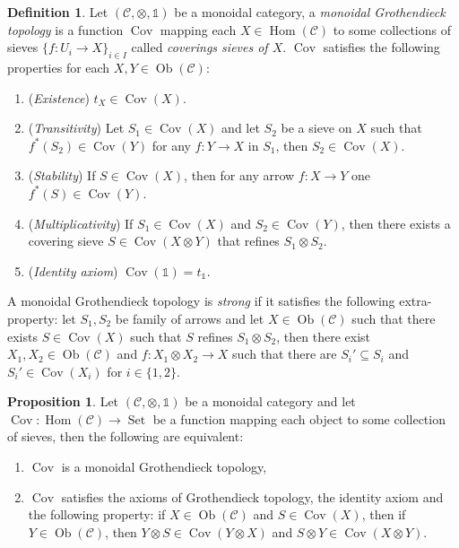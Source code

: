 \documentclass[8pt]{article}
\theoremstyle{definition}
\newtheorem{definition}{Definition}[section]
\theoremstyle{definition}
\theoremstyle{definition}
\theoremstyle{definition}
\theoremstyle{definition}
\theoremstyle{definition}
\theoremstyle{definition}
\newtheorem{prop}{Proposition}[section]
\theoremstyle{definition}
\theoremstyle{definition}
\theoremstyle{definition}
\theoremstyle{definition}
\theoremstyle{definition}
\theoremstyle{definition}
\theoremstyle{question}
\newcommand{\Ob}[1]{\operatorname{Ob}({\mathcal{#1}})}
\begin{document}
\begin{definition}
  Let $(\mathcal{C}, \otimes, \mathds{1})$ be a monoidal category, a \emph{monoidal Grothendieck topology}
  is a function $\operatorname{Cov}$ mapping each $X \in \operatorname{Hom}(\mathcal{C})$ to some collections of 
  sieves $\{f : U_i \to X \}_{i \in I}$ called \emph{coverings sieves of $X$}. 
  $\operatorname{Cov}$ satisfies the following properties for each $X, Y \in \Ob{C}$:
  \begin{enumerate}
    \item (\emph{Existence}) $t_X \in \operatorname{Cov}(X)$.
    \item (\emph{Transitivity}) Let $S_1 \in \operatorname{Cov}(X)$ and let $S_2$
    be a sieve on $X$ such that $f^*(S_2) \in \operatorname{Cov}(Y)$ for any $f : Y \to X$ in $S_1$, 
    then $S_2 \in \operatorname{Cov}(X)$.
    \item (\emph{Stability}) If $S \in \operatorname{Cov}(X)$, then for any arrow $f : X \to Y$ one
    $f^*(S) \in \operatorname{Cov}(Y)$.
    \item (\emph{Multiplicativity}) If $S_1 \in \operatorname{Cov}(X)$
    and $S_2 \in \operatorname{Cov}(Y)$, then there exists a covering sieve $S \in \operatorname{Cov}(X \otimes Y)$
    that refines $S_1 \otimes S_2$.
    \item (\emph{Identity axiom}) $\operatorname{Cov}(\mathds{1}) = t_{\mathds{1}}$.
  \end{enumerate}
\end{definition}

A monoidal Grothendieck topology is \emph{strong} if it satisfies the following extra-property:
let $S_1, S_2$ be family of arrows and let $X \in \Ob{C}$ such that there exists $S \in \operatorname{Cov}(X)$
such that $S$ refines $S_1 \otimes S_2$, then there
exist $X_1, X_2 \in \Ob{C}$ and $f : X_1 \otimes X_2 \to X$
such that there are $S_i' \subseteq S_i$ and $S_i' \in \operatorname{Cov}(X_i)$
for $i \in \{ 1, 2\}$.

\begin{prop} Let $(\mathcal{C}, \otimes, \mathds{1})$ be a monoidal category and let
  $\operatorname{Cov} : \operatorname{Hom}(\mathcal{C}) \to \operatorname{Set}$ be a function mapping each object to 
  some collection of sieves, then the following are equivalent:
  \begin{enumerate}
    \item $\operatorname{Cov}$ is a monoidal Grothendieck topology,
    \item $\operatorname{Cov}$ satisfies the axioms of Grothendieck topology, the identity axiom and the following property:
    if $X \in \Ob{C}$ and $S \in \operatorname{Cov}(X)$, then
    if $Y \in \Ob{C}$, then $Y \otimes S \in \operatorname{Cov}(Y \otimes X)$
    and $S \otimes Y \in \operatorname{Cov}(X \otimes Y)$.
  \end{enumerate}
\end{prop}
\end{document}
